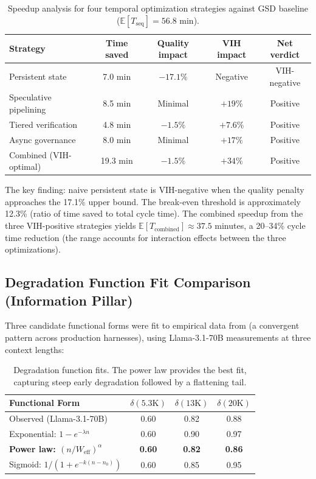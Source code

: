 \documentclass[11pt, a4paper]{googledeepmind}
\newcommand{\E}{\mathbb{E}}
\begin{document}
\begin{appendices}
\begin{table}[htbp]
\centering
\caption{Speedup analysis for four temporal optimization strategies against GSD baseline ($\E[T_{\mathrm{seq}}] = 56.8$ min).}
\label{tab:ext-speedup}
\begin{tabular}{lcccc}
\toprule
\textbf{Strategy} & \textbf{Time saved} & \textbf{Quality impact} & \textbf{VIH impact} & \textbf{Net verdict} \\
\midrule
Persistent state & 7.0 min & $-17.1\%$ & Negative & VIH-negative \\
Speculative pipelining & 8.5 min & Minimal & $+19\%$ & Positive \\
Tiered verification & 4.8 min & $-1.5\%$ & $+7.6\%$ & Positive \\
Async governance & 8.0 min & Minimal & $+17\%$ & Positive \\
\midrule
Combined (VIH-optimal) & 19.3 min & $-1.5\%$ & $+34\%$ & Positive \\
\bottomrule
\end{tabular}
\end{table}

The key finding: naive persistent state is VIH-negative when the quality penalty
approaches the 17.1\% upper bound. The break-even threshold is approximately
12.3\% (ratio of time saved to total cycle time). The combined speedup from the
three VIH-positive strategies yields $\E[T_{\mathrm{combined}}] \approx 37.5$ minutes,
a 20--34\% cycle time reduction (the range accounts for interaction effects between
the three optimizations).


\subsection{Degradation Function Fit Comparison (Information Pillar)}
\label{app:degradation-fit}

Three candidate functional forms were fit to empirical data from
\citet{du2025context} (a convergent pattern across production harnesses),
using Llama-3.1-70B measurements at three context lengths:

\begin{table}[htbp]
\centering
\caption{Degradation function fits. The power law provides the best fit, capturing steep early degradation followed by a flattening tail.}
\label{tab:ext-degradation}
\small
\begin{tabular}{lccc}
\toprule
\textbf{Functional Form} & $\delta(5.3\text{K})$ & $\delta(13\text{K})$ & $\delta(20\text{K})$ \\
\midrule
Observed (Llama-3.1-70B) & 0.60 & 0.82 & 0.88 \\
Exponential: $1 - e^{-\lambda n}$ & 0.60 & 0.90 & 0.97 \\
\textbf{Power law: $(n/W_{\text{eff}})^\alpha$} & \textbf{0.60} & \textbf{0.82} & \textbf{0.86} \\
Sigmoid: $1/(1+e^{-k(n-n_0)})$ & 0.60 & 0.85 & 0.95 \\
\bottomrule
\end{tabular}
\end{table}


\end{appendices}
\end{document}
